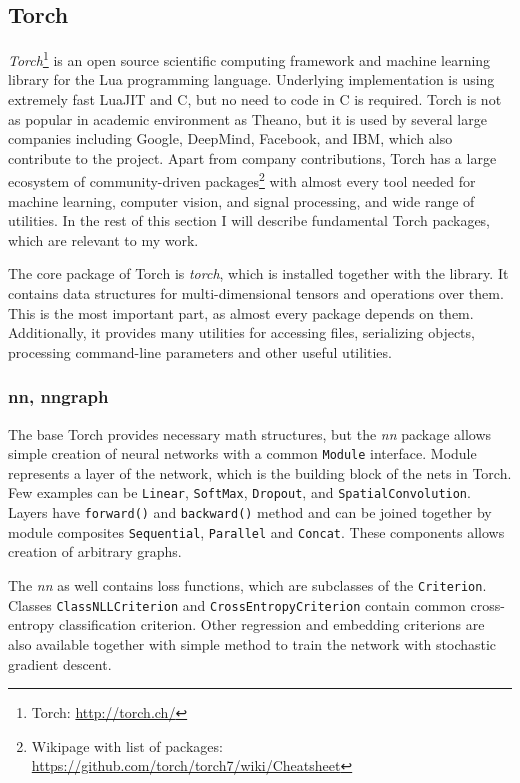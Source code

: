 \subsection{Torch}

\emph{Torch}\footnote{Torch: \url{http://torch.ch/}} is an open source scientific computing framework and machine learning library for the Lua programming language. Underlying implementation is using extremely fast LuaJIT and C, but no need to code in C is required. Torch is not as popular in academic environment as Theano, but it is used by several large companies including Google, DeepMind, Facebook, and IBM, which also contribute to the project. Apart from company contributions, Torch has a large ecosystem of community-driven packages\footnote{Wikipage with list of packages: \url{https://github.com/torch/torch7/wiki/Cheatsheet}} with almost every tool needed for machine learning, computer vision, and signal processing, and wide range of utilities. In the rest of this section I will describe fundamental Torch packages, which are relevant to my work.

The core package of Torch is \emph{torch}, which is installed together with the library. It contains data structures for multi-dimensional tensors and operations over them. This is the most important part, as almost every package depends on them. Additionally, it provides many utilities for accessing files, serializing objects, processing command-line parameters and other useful utilities.

\subsubsection{nn, nngraph}

The base Torch provides necessary math structures, but the \emph{nn} package allows simple creation of neural networks with a common \texttt{Module} interface. Module represents a layer of the network, which is the building block of the nets in Torch. Few examples can be \texttt{Linear}, \texttt{SoftMax}, \texttt{Dropout}, and \texttt{SpatialConvolution}. Layers have \texttt{forward()} and \texttt{backward()} method and can be joined together by module composites \texttt{Sequential}, \texttt{Parallel} and \texttt{Concat}. These components allows creation of arbitrary graphs.

The \emph{nn} as well contains loss functions, which are subclasses of the \texttt{Criterion}. Classes \texttt{ClassNLLCriterion} and \texttt{CrossEntropyCriterion} contain common cross-entropy classification criterion. Other regression and embedding criterions are also available together with simple method to train the network with stochastic gradient descent.

